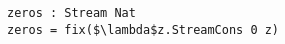\begin{lstlisting}[mathescape]
zeros : Stream Nat
zeros = fix($\lambda$z.StreamCons 0 z)
\end{lstlisting}